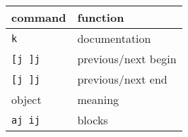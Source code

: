 \begin{tabular}{l l}
  \toprule
  command        & function            \\
  \midrule
  \texttt{k}     & documentation       \\
  \texttt{[j ]j} & previous/next begin \\
  \texttt{[j ]j} & previous/next end   \\
  \midrule
  \midrule
  object         & meaning             \\
  \midrule
  \texttt{aj ij} & blocks              \\
  \bottomrule
\end{tabular}
